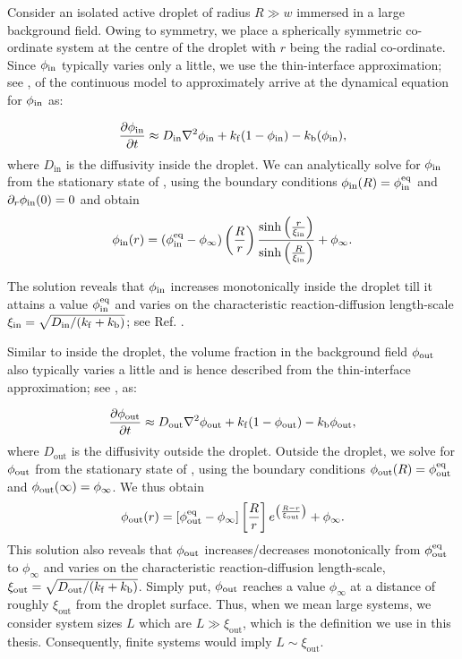 Consider an isolated active droplet of radius $R \gg w$ immersed in a large background field.
Owing to symmetry, we place a spherically symmetric co-ordinate system at the centre of the droplet with $r$ being the radial co-ordinate.
Since $\phi_\mathrm{in}$ typically varies only a little, we use the thin-interface approximation; see , of the continuous model to approximately arrive at the dynamical equation for $\phi_\mathrm{in}$ as:

\begin{align} 
    \label{eqn:RD_droplet_firstorder}
    \frac{\partial \phi_\mathrm{in}}{\partial t}
        \approx D_\mathrm{in} \nabla^2 \phi_\mathrm{in} +
         k_\mathrm{f} (1 - \phi_\mathrm{in}) - k_\mathrm{b} (\phi_\mathrm{in}),
\end{align}
where $D_\mathrm{in}$ is the diffusivity inside the droplet.
We can analytically solve for $\phi_\mathrm{in}$ from the stationary state of , using the boundary conditions $\phi_\mathrm{in}(R) = \phi^\mathrm{eq}_\mathrm{in}$ and $\partial_r \phi_\mathrm{in} (0) = 0$ and obtain 
\begin{equation*}
    \phi_\mathrm{in}(r) = \left (\phi^\mathrm{eq}_\mathrm{in} - \phi_\infty \right ) \left( \frac{R}{r} \right ) \frac{\sinh \left(\frac{r}{\xi_\mathrm{in} }\right)}{\sinh \left(\frac{R}{\xi_\mathrm{in} }\right)} + \phi_\infty.
\end{equation*}

The solution reveals that $\phi_\mathrm{in}$ increases monotonically inside the droplet till it attains a value $\phi^\mathrm{eq}_\mathrm{in}$ and varies on the characteristic reaction-diffusion length-scale $\xi_\mathrm{in}=\sqrt{D_\mathrm{in}/({k_\mathrm{f} + k_\mathrm{b}})}$; see Ref. \cite{Review2019}.

Similar to inside the droplet, the volume fraction in the background field $\phi_\mathrm{out}$ also typically varies a little and is hence described from the thin-interface approximation; see , as:

\begin{align} 
    \label{eqn:RD_dilute_firstorder}
    \frac{\partial \phi_\mathrm{out}}{\partial t}
        \approx D_\mathrm{out} \nabla^2 \phi_\mathrm{out} +
         k_\mathrm{f} (1 - \phi_\mathrm{out}) - k_\mathrm{b} \phi_\mathrm{out},
\end{align}
where $D_\mathrm{out}$ is the diffusivity outside the droplet.
Outside the droplet, we solve for $\phi_\mathrm{out}$ from the stationary state of , using the boundary conditions $\phi_\mathrm{out}(R) = \phi^\mathrm{eq}_\mathrm{out}$ and $\phi_\mathrm{out}(\infty) = \phi_\infty$.
We thus obtain 
\begin{equation*}
    \phi_\mathrm{out}(r) =  [\phi^\mathrm{eq}_\mathrm{out} - \phi_\infty] \left [ \frac{R}{r} \right ] e^{\left({\frac{R - r}{\xi_\mathrm{out}}}\right)} + \phi_\infty.
\end{equation*}
This solution also reveals that $\phi_\mathrm{out}$ increases/decreases monotonically from $\phi^\mathrm{eq}_\mathrm{out}$ to $\phi_\infty$ and varies on the characteristic reaction-diffusion length-scale, $\xi_\mathrm{out}=\sqrt{D_\mathrm{out}/({k_\mathrm{f} + k_\mathrm{b}})}$.
Simply put, $\phi_\mathrm{out}$ reaches a value $\phi_\infty$ at a distance of roughly $\xi_\mathrm{out}$ from the droplet surface.
Thus, when we mean large systems, we consider system sizes $L$ which are $L \gg \xi_\mathrm{out}$, which is the definition we use in this thesis.
Consequently, finite systems would imply $L \sim \xi_\mathrm{out}$.

